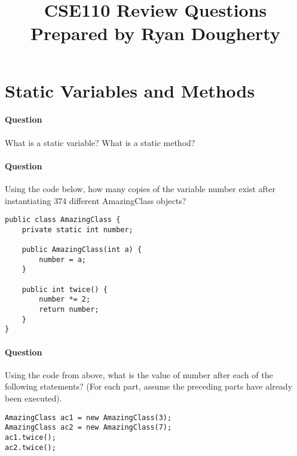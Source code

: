 \documentclass{article}
\date{}
\begin{document}
\title{\textbf{CSE110 Review Questions \\
Prepared by Ryan Dougherty}}
\maketitle

\section*{Static Variables and Methods}


\setcounter{question_num}{1}
\paragraph{Question }
What is a static variable? What is a static method?

\addtocounter{question_num}{1}
\paragraph{Question }
Using the code below, how many copies of the variable number exist after instantiating 374 different AmazingClass objects?
\begin{lstlisting}
public class AmazingClass {
	private static int number;

	public AmazingClass(int a) {
		number = a;
	}

	public int twice() {
		number *= 2;
		return number;
	}
}
\end{lstlisting}

\addtocounter{question_num}{1}
\paragraph{Question }
Using the code from above, what is the value of number after each of the following statements? (For each part, assume the preceding parts have already been executed).
\begin{lstlisting}
AmazingClass ac1 = new AmazingClass(3);
AmazingClass ac2 = new AmazingClass(7);
ac1.twice();
ac2.twice();
\end{lstlisting}
\end{document}
